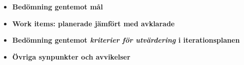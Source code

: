 \begin{itemize}
	\item \textbf{Bedömning gentemot mål}
	\item \textbf{Work items: planerade jämfört med avklarade}
	\item \textbf{Bedömning gentemot \textit{kriterier för utvärdering} i iterationsplanen}
	\item \textbf{Övriga synpunkter och avvikelser}
\end{itemize}



